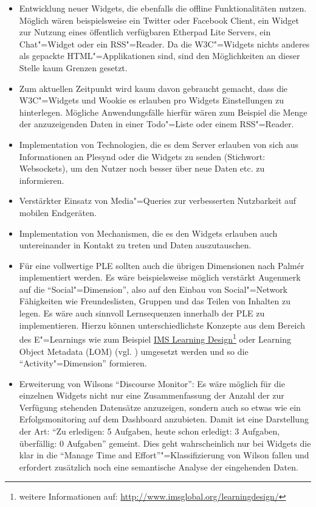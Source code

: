 \begin{itemize}
 \item Entwicklung neuer Widgets, die ebenfalls die offline Funktionalitäten nutzen. Möglich wären beispielsweise ein Twitter oder Facebook Client, ein Widget zur Nutzung eines öffentlich verfügbaren Etherpad Lite Servers, ein Chat"=Widget oder ein RSS"=Reader. Da die W3C"=Widgets nichts anderes als gepackte HTML"=Applikationen sind, sind den Möglichkeiten an dieser Stelle kaum Grenzen gesetzt.
 \item Zum aktuellen Zeitpunkt wird kaum davon gebraucht gemacht, dass die W3C"=Widgets und Wookie es erlauben pro Widgets Einstellungen zu hinterlegen. Mögliche Anwendungsfälle hierfür wären zum Beispiel die Menge der anzuzeigenden Daten in einer Todo"=Liste oder einem RSS"=Reader.
 \item Implementation von Technologien, die es dem Server erlauben von sich aus Informationen an Plesynd oder die Widgets zu senden (Stichwort: Websockets), um den Nutzer noch besser über neue Daten etc. zu informieren.
 \item Verstärkter Einsatz von Media"=Queries zur verbesserten Nutzbarkeit auf mobilen Endgeräten.
 \item Implementation von Mechanismen, die es den Widgets erlauben auch untereinander in Kontakt zu treten und Daten auszutauschen.
 \item Für eine vollwertige PLE sollten auch die übrigen Dimensionen nach Palmér implementiert werden. Es wäre beispielsweise möglich verstärkt Augenmerk auf die "`Social"=Dimension"', also auf den Einbau von Social"=Network Fähigkeiten wie Freundeslisten, Gruppen und das Teilen von Inhalten zu legen. Es wäre auch sinnvoll Lernsequenzen innerhalb der PLE zu implementieren. Hierzu können unterschiedlichste Konzepte aus dem Bereich des E"=Learnings wie zum Beispiel \href{http://www.imsglobal.org/learningdesign/}{IMS Learning Design}\footnote{weitere Informationen auf: \url{http://www.imsglobal.org/learningdesign/}} oder Learning Object Metadata (LOM) (vgl. \cite{LOM2002}) umgesetzt werden und so die "`Activity"=Dimension"' formieren.
 \item Erweiterung von Wilsons "`Discourse Monitor"': Es wäre möglich für die einzelnen Widgets nicht nur eine Zusammenfassung der Anzahl der zur Verfügung stehenden Datensätze anzuzeigen, sondern auch so etwas wie ein Erfolgsmonitoring auf dem Dashboard anzubieten. Damit ist eine Darstellung der Art: "`Zu erledigen: 5 Aufgaben, heute schon erledigt: 3 Aufgaben, überfällig: 0 Aufgaben"' gemeint. Dies geht wahrscheinlich nur bei Widgets die klar in die “Manage Time and Effort”"=Klassifizierung von Wilson fallen und erfordert zusätzlich noch eine semantische Analyse der eingehenden Daten.
\end{itemize}




